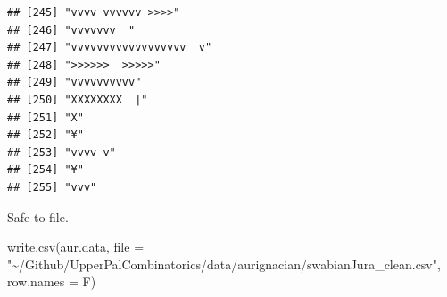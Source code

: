 \documentclass[
]{article}
\newenvironment{Shaded}{\begin{snugshade}}{\end{snugshade}}
\newcommand{\AttributeTok}[1]{\textcolor[rgb]{0.77,0.63,0.00}{#1}}
\newcommand{\CommentTok}[1]{\textcolor[rgb]{0.56,0.35,0.01}{\textit{#1}}}
\newcommand{\FunctionTok}[1]{\textcolor[rgb]{0.00,0.00,0.00}{#1}}
\newcommand{\NormalTok}[1]{#1}
\newcommand{\OtherTok}[1]{\textcolor[rgb]{0.56,0.35,0.01}{#1}}
\newcommand{\SpecialCharTok}[1]{\textcolor[rgb]{0.00,0.00,0.00}{#1}}
\newcommand{\StringTok}[1]{\textcolor[rgb]{0.31,0.60,0.02}{#1}}
\begin{document}
\begin{verbatim}
## [245] "vvvv vvvvvv >>>>"                                                                                                                         
## [246] "vvvvvvv  "                                                                                                                                
## [247] "vvvvvvvvvvvvvvvvvv  v"                                                                                                                    
## [248] ">>>>>>  >>>>>"                                                                                                                            
## [249] "vvvvvvvvvv"                                                                                                                               
## [250] "XXXXXXXX  |"                                                                                                                              
## [251] "X"                                                                                                                                        
## [252] "¥"                                                                                                                                        
## [253] "vvvv v"                                                                                                                                   
## [254] "¥"                                                                                                                                        
## [255] "vvv"
\end{verbatim}

\begin{Shaded}
\end{Shaded}

Safe to file.

\begin{Shaded}
\begin{Highlighting}[]
\FunctionTok{write.csv}\NormalTok{(aur.data, }
          \AttributeTok{file =} \StringTok{"\textasciitilde{}/Github/UpperPalCombinatorics/data/aurignacian/swabianJura\_clean.csv"}\NormalTok{,}
          \AttributeTok{row.names =}\NormalTok{ F)}
\end{Highlighting}
\end{Shaded}
\end{document}
